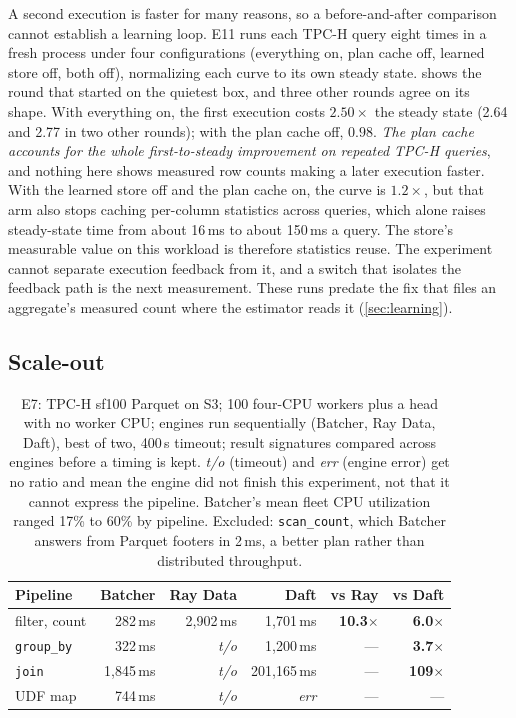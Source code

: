 \documentclass[10pt,twocolumn,letterpaper]{article}   %
\newcommand{\sys}{Batcher}
\newcommand{\win}{\cellcolor{okSky!22}}
\newcommand{\E}[1]{\textsf{E#1}}
\begin{document}
A second execution is faster for many reasons, so a before-and-after comparison cannot
establish a learning loop. \E{11} runs each TPC-H query eight times in a fresh process under
four configurations (everything on, plan cache off, learned store off, both off), normalizing
each curve to its own steady state.  shows the round that started on the
quietest box, and three other rounds agree on its shape. With everything on, the first execution
costs $2.50\times$ the steady state (2.64 and 2.77 in two other rounds); with the plan cache
off, $0.98$. \emph{The plan cache accounts for the whole first-to-steady improvement on repeated
TPC-H queries}, and nothing here shows measured row counts making a later execution faster.
With the learned store off and the plan cache on, the curve is $1.2\times$, but that arm also
stops caching per-column statistics across queries, which alone raises steady-state time from
about 16\,ms to about 150\,ms a query. The store's measurable value on this workload is
therefore statistics reuse. The experiment cannot separate execution feedback from it, and a
switch that isolates the feedback path is the next measurement. These runs predate the fix that
files an aggregate's measured count where the estimator reads it (\cref{sec:learning}).

\subsection{Scale-out}
\label{sec:eval-cluster}

\begin{table}[tbp]
\centering\footnotesize
\setlength{\tabcolsep}{3.0pt}
\begin{tabular}{@{}lrrrrr@{}}
\toprule
Pipeline & \sys{} & Ray Data & Daft & vs Ray & vs Daft \\
\midrule
filter, count & 282\,ms & 2{,}902\,ms & 1{,}701\,ms & \win \textbf{10.3}$\times$ & \win \textbf{6.0}$\times$ \\
\texttt{group\_by} & 322\,ms & \emph{t/o} & 1{,}200\,ms & --- & \win \textbf{3.7}$\times$ \\
\texttt{join} & 1{,}845\,ms & \emph{t/o} & 201{,}165\,ms & --- & \win \textbf{109}$\times$ \\
UDF map & 744\,ms & \emph{t/o} & \emph{err} & --- & --- \\
\bottomrule
\end{tabular}
\caption{\E{7}: TPC-H sf100 Parquet on S3; 100 four-CPU workers plus a head with no worker CPU;
engines run sequentially (\sys{}, Ray Data, Daft), best of two, 400\,s timeout; result
signatures compared across engines before a timing is kept. \emph{t/o} (timeout) and
\emph{err} (engine error) get no ratio and mean the engine did not finish this experiment, not
that it cannot express the pipeline. \sys{}'s mean fleet CPU utilization ranged 17\% to 60\% by
pipeline. Excluded: \texttt{scan\_count}, which \sys{} answers from Parquet footers in 2\,ms, a
better plan rather than distributed throughput.}
\label{tab:cluster}
\end{table}
\end{document}
